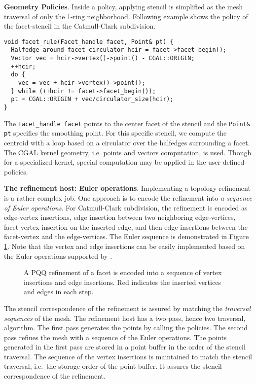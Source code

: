 \noindent\textbf{Geometry Policies}.
Inside a policy, applying stencil is simplified as 
the mesh traversal of only the 1-ring neighborhood. 
Following example shows the policy of the facet-stencil 
in the Catmull-Clark subdivision.
\begin{lstlisting}
void facet_rule(Facet_handle facet, Point& pt) {
  Halfedge_around_facet_circulator hcir = facet->facet_begin();
  Vector vec = hcir->vertex()->point() - CGAL::ORIGIN;
  ++hcir;
  do {
    vec = vec + hcir->vertex()->point();
  } while (++hcir != facet->facet_begin());
  pt = CGAL::ORIGIN + vec/circulator_size(hcir);
}
\end{lstlisting}
The \lstinline!Facet_handle facet! points to the 
center facet of the stencil and the \lstinline!Point& pt! 
specifies the smoothing point. For this specific stencil, 
we compute the centroid with a loop based on a circulator 
over the halfedges surrounding a facet. The CGAL kernel 
geometry, i.e. points and vectors computation, is used. 
Though for a specialized kernel, special computation may be 
applied in the user-defined policies.
 
\noindent\textbf{The refinement host: Euler operations}.
Implementing a topology refinement is a rather complex job. One
approach is to encode the refinement into \emph{a sequence of Euler
operations}. For Catmull-Clark subdivision, the refinement is encoded
as edge-vertex insertions, edge insertion between two neighboring
edge-vertices, facet-vertex insertion on the inserted edge, and then
edge insertions between the facet-vertex and the edge-vertices. 
The Euler sequence is demonstrated in Figure \ref{fig:CCRefinement}. 
Note that the vertex and edge insertions can be easily 
implemented based on the Euler operations supported by \cgalpoly.
\begin{figure}
  \centering
  \caption{A PQQ refinement of a facet is encoded into a sequence of
  vertex insertions and edge insertions. Red indicates the inserted
  vertices and edges in each step.}
  \label{fig:CCRefinement}
\end{figure}

The stencil correspondence of the refinement is assured
by matching the \emph{traversal sequences} of the mesh. 
The refinement host has a two pass, hence two traversal, 
algorithm. The first pass generates the points by 
calling the policies. The second pass
refines the mesh with a sequence of the Euler operations.
The points generated in the first pass are stored in a
point buffer in the order of the stencil 
traversal. The sequence of the vertex insertions 
is maintained to match the stencil traversal, i.e.\ 
the storage order of the point buffer. It assures 
the stencil correspondence of the refinement.

